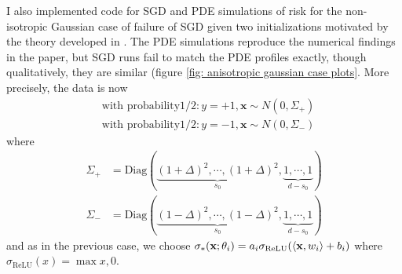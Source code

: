 \documentclass{article}
\begin{document}
I also implemented code for SGD and PDE simulations of risk for the non-isotropic Gaussian case of failure of SGD given two initializations motivated by the theory developed in \cite{Mei_2018}. The PDE simulations reproduce the numerical findings in the paper, but SGD runs fail to match the PDE profiles exactly, though qualitatively, they are similar (figure \ref{fig: anisotropic gaussian case plots}. More precisely, the data is now 
\begin{equation}
\begin{array}{cc}
& \text{with probability}  1/2: y = +1, \mathbf{x}\sim N(0, \Sigma_+)\\
& \text{with probability}  1/2: y = -1, \mathbf{x}\sim N(0, \Sigma_-)
\end{array}
\end{equation}
where 
\begin{equation}
\begin{array}{cc}
	\Sigma_+ &= \text{Diag}(\underbrace{(1+\Delta)^{2}, \cdots, (1+\Delta)^{2}}_{s_0}, \underbrace{1,\cdots, 1}_{d-s_0})\\ 
 \Sigma_- &= \text{Diag}(\underbrace{(1-\Delta)^{2}, \cdots, (1-\Delta)^{2}}_{s_0}, \underbrace{1,\cdots, 1}_{d-s_0})
\end{array}
\end{equation}
and as in the previous case, we choose $\sigma_*(\mathbf{x};\mathbf{\theta}_{i})=a_{i}\sigma_{\text{ReLU}}(\langle \mathbf{x}, w_{i}\rangle+b_{i})$  where $ \sigma_{\text{ReLU}}(x) = \max{x,0}$.
\end{document}
